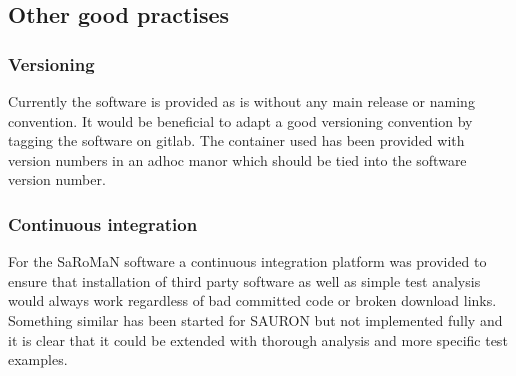 






\subsection{Other good practises}

\subsubsection{Versioning}
Currently the software is provided as is without any main release or naming convention. It would be beneficial to adapt a good versioning convention by tagging the software on gitlab. The container used has been provided with version numbers in an adhoc manor which should be tied into the software version number.

\subsubsection{Continuous integration}
For the SaRoMaN software a continuous integration platform was provided to ensure that installation of third party software as well as simple test analysis would always work regardless of bad committed code or broken download links. Something similar has been started for SAURON but not implemented fully and it is clear that it could be extended with thorough analysis and more specific test examples.

